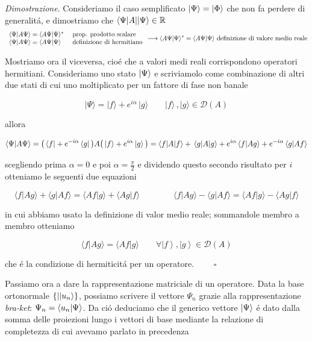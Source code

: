 \begin{enumerate}
	
	\textit{Dimostrazione}. Consideriamo il caso semplificato $\ket{\Psi} = \ket{\Phi}$ che non fa perdere di generalit\'a, e dimostriamo che $\bra{\Psi|A}\ket{\Psi} \in \mathbb{R}$
	\begin{equation*}
		\begin{array}{l l}
			\braket{\Psi}{A\Psi} = \braket{A\Psi}{\Psi}^* & \text{ prop. prodotto scalare}
			\\
			\braket{\Psi}{A\Psi} = \braket{A\Psi}{\Psi} & \text{ definizione di hermitiano}
		\end{array}
		\longrightarrow \braket{A\Psi}{\Psi}^* = \braket{A\Psi}{\Psi} \text{ definizione di valore medio reale}
	\end{equation*}
	
	Mostriamo ora il viceversa, cio\'e che a valori medi reali corrispondono operatori hermitiani. Consideriamo uno stato $\ket{\Psi}$ e scriviamolo come combinazione di altri due stati di cui uno moltiplicato per un fattore di fase non banale
	
	$$|\Psi\rangle=|f\rangle+e^{i\alpha}\,|g\rangle\qquad|f\rangle\,,|g\rangle\in{\mathcal{D}}(A)$$
	
	allora
	
	$$\langle\Psi|A\Psi\rangle=\big{(}\,\langle f|+e^{-i\alpha}\,\langle g|\,\big{)}A\big{(}\,|f\rangle+e^{i\alpha}\,|g\rangle\,\big{)}=\langle f|A|f\rangle+\,\langle g|A|g\rangle+e^{i\alpha}\,\langle f|Ag\rangle+e^{-i\alpha}\,\langle g|Af\rangle$$
	
	scegliendo prima $\alpha = 0$ e poi $\alpha = \frac{\pi}{2}$ e dividendo questo secondo risultato per $i$ otteniamo le seguenti due equazioni
	
	$$\langle f|A g\rangle+\langle g|A f\rangle=\langle A f|g\rangle+\langle A g|f\rangle \qquad\qquad \langle f|A g\rangle-\langle g|A f\rangle=\langle A f|g\rangle-\langle A g|f\rangle$$
	
	in cui abbiamo usato la definizione di valor medio reale; sommandole membro a membro otteniamo
	
	$$\langle f|A g\rangle=\langle A f|g\rangle\qquad\forall\left|f\right\rangle,\left|g\right\rangle\in{\mathcal{D}}(A)$$
	
	che \'e la condizione di hermiticit\'a per un operatore. $\qquad\square$
\end{enumerate}

Passiamo ora a dare la rappresentazione matriciale di un operatore. Data la base ortonormale $\{|\ket{u_n}\}$, possiamo scrivere il vettore $\Psi_n$ grazie alla rappresentazione \textit{bra-ket}: $\Psi_n = \braket{u_n}{\Psi}$. Da ci\'o deduciamo che il generico vettore $\ket{\Psi}$ \'e dato dalla somma delle proiezioni lungo i vettori di base mediante la relazione di completezza di cui avevamo parlato in precedenza

